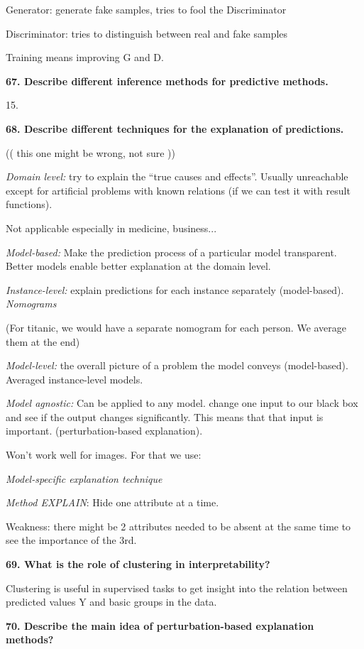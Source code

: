 Generator: generate fake samples, tries to fool the Discriminator

Discriminator: tries to distinguish between real and fake samples

Training means improving G and D.

\textbf{67. Describe different inference methods for predictive
methods.}

15.

\textbf{68. Describe different techniques for the explanation of
predictions.}

(( this one might be wrong, not sure ))

\textit{Domain level:} try to explain the ``true causes and
effects''. Usually unreachable except for artificial problems with known
relations (if we can test it with result functions).

Not applicable especially in medicine, business...

\textit{Model-based:} Make the prediction process of a particular
model transparent. Better models enable better explanation at the domain
level.

\textit{Instance-level:} explain predictions for each instance
separately (model-based). \emph{Nomograms}

(For titanic, we would have a separate nomogram for each person. We
average them at the end)

\textit{Model-level:} the overall picture of a problem the model
conveys (model-based). Averaged instance-level models.

\textit{Model agnostic:} Can be applied to any model. change one
input to our black box and see if the output changes significantly. This
means that that input is important. (perturbation-based explanation).

Won't work well for images. For that we use:

\textit{Model-specific explanation technique}

\textit{Method EXPLAIN}: Hide one attribute at a time.

Weakness: there might be 2 attributes needed to be absent at the same
time to see the importance of the 3rd.

\textbf{69. What is the role of clustering in interpretability?}

Clustering is useful in supervised tasks to get insight into the
relation between predicted values Y and basic groups in the data.

\textbf{70. Describe the main idea of perturbation-based explanation
methods?}

